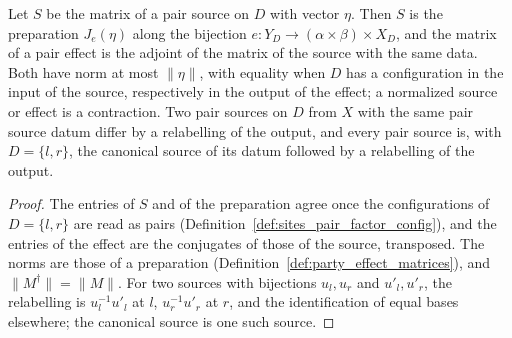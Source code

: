 \begin{theorem}
    \label{thm:party_pair_gate_matrices}
    \leanok
    Let $S$ be the matrix of a pair source on $D$ with vector $\eta$. Then $S$ is the
    preparation $J_e(\eta)$ along the bijection $e\colon Y_D\to(\alpha\times\beta)\times X_D$,
    and the matrix of a pair effect is the adjoint of the matrix of the source with the
    same data. Both have norm at most $\lVert\eta\rVert$, with equality when $D$ has a
    configuration in the input of the source, respectively in the output of the effect;
    a normalized source or effect is a contraction. Two pair sources on $D$ from $X$
    with the same pair source datum differ by a relabelling of the output, and every
    pair source is, with $D=\{l,r\}$, the canonical source of its datum followed by a
    relabelling of the output.
\end{theorem}
\begin{proof}\leanok
    The entries of $S$ and of the preparation agree once the configurations of
    $D=\{l,r\}$ are read as pairs (Definition~\ref{def:sites_pair_factor_config}), and
    the entries of the effect are the conjugates of those of the source, transposed.
    The norms are those of a preparation (Definition~\ref{def:party_effect_matrices}),
    and $\lVert M^\dagger\rVert=\lVert M\rVert$. For two sources with bijections
    $u_l,u_r$ and $u'_l,u'_r$, the relabelling is $u_l^{-1}u'_l$ at $l$,
    $u_r^{-1}u'_r$ at $r$, and the identification of equal bases elsewhere; the
    canonical source is one such source.
\end{proof}

